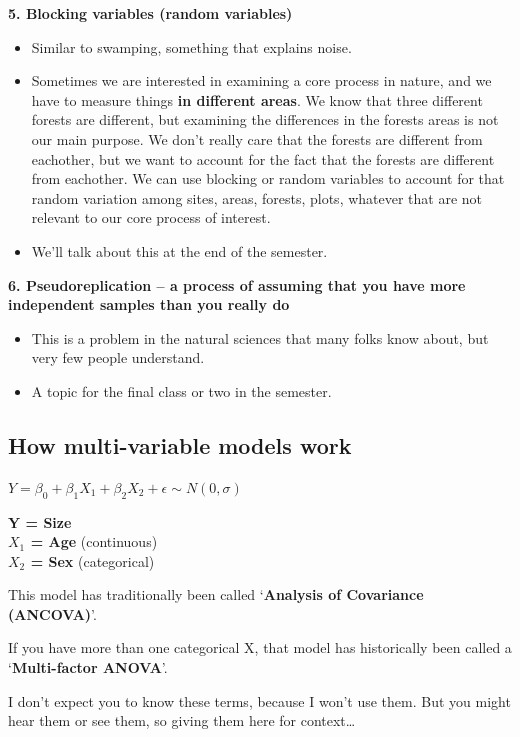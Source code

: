 \documentclass[
]{article}
\providecommand{\tightlist}{%
  \setlength{\itemsep}{0pt}\setlength{\parskip}{0pt}}
\begin{document}
\textbf{5. Blocking variables (random variables)}

\begin{itemize}
\tightlist
\item
  Similar to swamping, something that explains noise.
\item
  Sometimes we are interested in examining a core process in nature, and
  we have to measure things \textbf{in different areas}. We know that
  three different forests are different, but examining the differences
  in the forests areas is not our main purpose. We don't really care
  that the forests are different from eachother, but we want to account
  for the fact that the forests are different from eachother. We can use
  blocking or random variables to account for that random variation
  among sites, areas, forests, plots, whatever that are not relevant to
  our core process of interest.
\item
  We'll talk about this at the end of the semester.
\end{itemize}

\textbf{6. Pseudoreplication -- a process of assuming that you have more
independent samples than you really do}

\begin{itemize}
\tightlist
\item
  This is a problem in the natural sciences that many folks know about,
  but very few people understand.
\item
  A topic for the final class or two in the semester.
\end{itemize}

\subsection{How multi-variable models
work}\label{how-multi-variable-models-work}

\textbf{\(Y = \beta_0 + \beta_1 X_1 + \beta_2 X_2 + \epsilon \sim N(0, \sigma)\)}

\textbf{Y = Size}\\
\textbf{\(X_1\) = Age} (continuous)\\
\textbf{\(X_2\) = Sex} (categorical)

This model has traditionally been called `\textbf{Analysis of Covariance
(ANCOVA)}'.

If you have more than one categorical X, that model has historically
been called a `\textbf{Multi-factor ANOVA}'.

I don't expect you to know these terms, because I won't use them. But
you might hear them or see them, so giving them here for context\ldots{}
\end{document}
